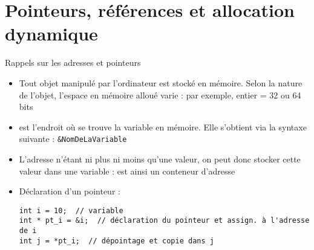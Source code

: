 \documentclass[c]{beamer}
\begin{document}

\part{Pointeurs, références et allocation dynamique}
\frame{\partpage}


\begin{frame}[fragile]{Rappels sur les adresses et pointeurs}
 \begin{itemize}
\item Tout objet manipulé par l'ordinateur est stocké en mémoire. Selon la nature de
l'objet, l'espace en mémoire alloué varie : par exemple, entier = 32 ou 64 bits

\item {} est l'endroit où se trouve la variable en mémoire. Elle s'obtient
via la syntaxe suivante : \texttt{\&NomDeLaVariable}

\item L'adresse n'étant ni plus ni moins qu'une valeur, on peut donc stocker cette
valeur dans une variable :  est ainsi un conteneur d'adresse

\item Déclaration d'un pointeur :

\begin{verbatim}
int i = 10;  // variable
int * pt_i = &i;  // déclaration du pointeur et assign. à l'adresse de i
int j = *pt_i;  // dépointage et copie dans j
\end{verbatim}
\end{itemize}
\end{frame}

\end{document}
